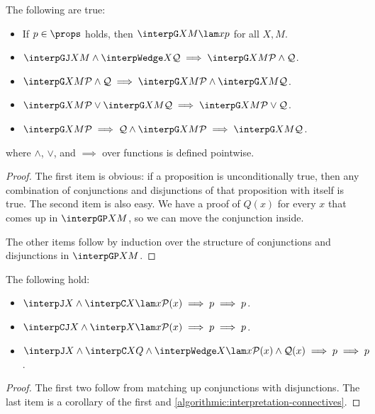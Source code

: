 \begin{lemma}
  \label{algorithmic:interpretation-connectives}
  The following are true:
  \begin{itemize}
    \item If $p \in \props$ holds, then $\interpG X M {\lam x p}$ for all $X, M$.
    \item $\interpGJ X M \wedge \interpWedge X {\mathcal Q} \implies \interpG X M {\mathcal P \wedge \mathcal Q}$.
    \item $\interpG X M {\mathcal P \wedge \mathcal Q} \implies \interpG X M {\mathcal P} \wedge \interpG X M {\mathcal Q}$.
    \item $\interpG X M {\mathcal P} \vee \interpG X M {\mathcal Q} \implies \interpG X M {\mathcal P \vee \mathcal Q}$.
    \item $\interpG X M {\mathcal P \implies \mathcal Q} \wedge \interpG X M {\mathcal P} \implies \interpG X M {\mathcal Q}$.
  \end{itemize}
  where $\wedge$, $\vee$, and $\implies$ over functions is defined pointwise.
\end{lemma}
\begin{proof}
  The first item is obvious: if a proposition is unconditionally true, then any combination of conjunctions and disjunctions of that proposition with itself is true. The second item is also easy. We have a proof of $Q(x)$ for every $x$ that comes up in $\interpGP X M$, so we can move the conjunction inside.

  The other items follow by induction over the structure of conjunctions and disjunctions in $\interpGP X M$.
\end{proof}


\begin{lemma}
  \label{algorithmic:interpretation-mix}
  The following hold:
  \begin{itemize}
    \item $\interpJ X \wedge \interpC X { \lam x {\mathcal P {(x)} \implies p} } \implies p$.
    \item $\interpCJ X \wedge \interp X { \lam x {\mathcal P {(x)} \implies p} } \implies p$.
    \item $ {\interpJ X \wedge \interpC X Q \wedge
     \interpWedge X {\lam x {\mathcal P {(x)} \wedge \mathcal Q {(x)} \implies p }} }
     \implies p$.
  \end{itemize}
\end{lemma}
\begin{proof}
  The first two follow from matching up conjunctions with disjunctions. The last item is a corollary of the first and \cref{algorithmic:interpretation-connectives}.
\end{proof}

